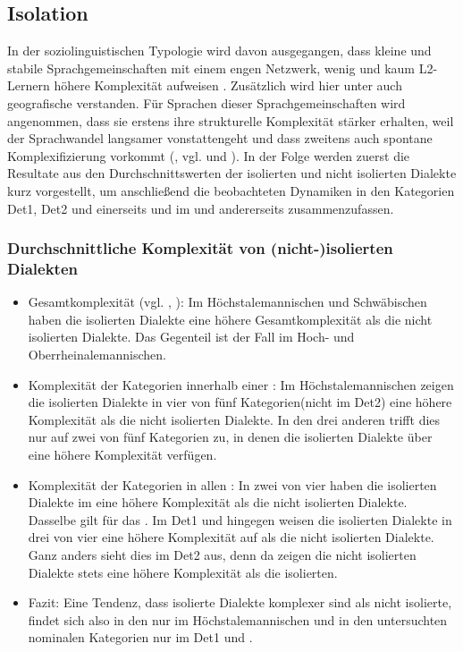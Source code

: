 \subsection{Isolation}\label{6.6.5}

In der soziolinguistischen Typologie wird davon ausgegangen, dass kleine und stabile Sprachgemeinschaften mit einem engen Netzwerk, wenig  und kaum L2-Ler\-nern höhere Komplexität aufweisen \citep[146–147]{Trudgill2011}. Zusätzlich wird hier unter  auch geografische  verstanden. Für Sprachen dieser Sprachgemeinschaften wird angenommen, dass sie erstens ihre strukturelle Komplexität stärker erhalten, weil der Sprachwandel langsamer vonstattengeht \citep[103]{Trudgill2011} und dass zweitens auch spontane Komplexifizierung vorkommt (\citealt[71]{Trudgill2011}, vgl.  und ). In der Folge werden zuerst die Resultate aus den Durchschnittswerten der isolierten und nicht isolierten Dialekte kurz vorgestellt, um anschließend die beobachteten Dynamiken in den Kategorien Det1, Det2 und  einerseits und im  und  andererseits zusammenzufassen. 

\subsubsection{Durchschnittliche Komplexität von (nicht-)isolierten Dialekten}

\begin{itemize}
\item
Gesamtkomplexität (vgl. , ): Im Höchstalemannischen und Schwäbischen haben die isolierten Dialekte eine höhere Gesamtkomplexität als die nicht isolierten Dialekte. Das Gegenteil ist der Fall im Hoch- und Oberrheinalemannischen.
\item
Komplexität der Kategorien innerhalb einer : Im Höchstalemannischen zeigen die isolierten Dialekte in vier von fünf Kategorien\linebreak (nicht im Det2) eine höhere Komplexität als die nicht isolierten Dialekte. In den drei anderen  trifft dies nur auf zwei von fünf Kategorien zu, in denen die isolierten Dialekte über eine höhere Komplexität verfügen.
\item
Komplexität der Kategorien in allen : In zwei von vier  haben die isolierten Dialekte im  eine höhere Komplexität als die nicht isolierten Dialekte. Dasselbe gilt für das . Im Det1 und  hingegen weisen die isolierten Dialekte in drei von vier  eine höhere Komplexität auf als die nicht isolierten Dialekte. Ganz anders sieht dies im Det2 aus, denn da zeigen die nicht isolierten Dialekte stets eine höhere Komplexität als die isolierten.
\item
Fazit: Eine Tendenz, dass isolierte Dialekte komplexer sind als nicht isolierte, findet sich also in den  nur im Höchstalemannischen und in den untersuchten nominalen Kategorien nur im Det1 und .
\end{itemize}

